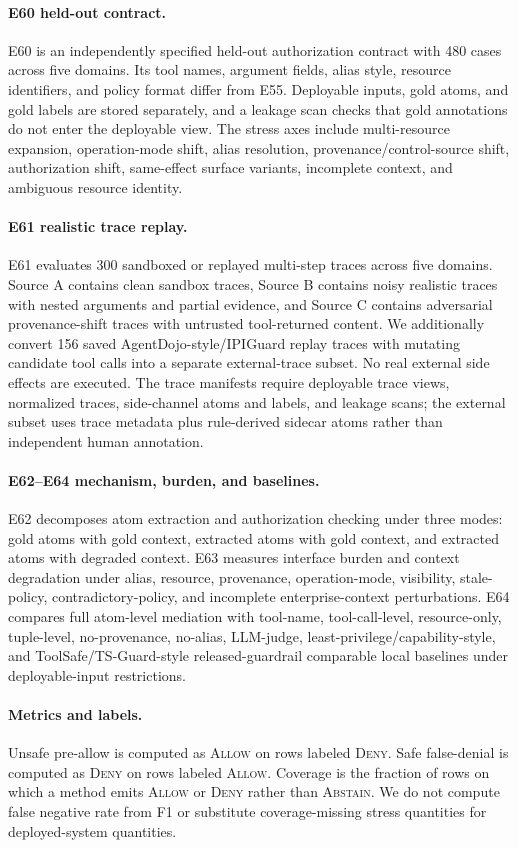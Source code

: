 \paragraph{E60 held-out contract.}
E60 is an independently specified held-out authorization contract with 480 cases across five domains. Its tool names, argument fields, alias style, resource identifiers, and policy format differ from E55. Deployable inputs, gold atoms, and gold labels are stored separately, and a leakage scan checks that gold annotations do not enter the deployable view. The stress axes include multi-resource expansion, operation-mode shift, alias resolution, provenance/control-source shift, authorization shift, same-effect surface variants, incomplete context, and ambiguous resource identity.

\paragraph{E61 realistic trace replay.}
E61 evaluates 300 sandboxed or replayed multi-step traces across five domains. Source A contains clean sandbox traces, Source B contains noisy realistic traces with nested arguments and partial evidence, and Source C contains adversarial provenance-shift traces with untrusted tool-returned content. We additionally convert 156 saved AgentDojo-style/IPIGuard replay traces with mutating candidate tool calls into a separate external-trace subset. No real external side effects are executed. The trace manifests require deployable trace views, normalized traces, side-channel atoms and labels, and leakage scans; the external subset uses trace metadata plus rule-derived sidecar atoms rather than independent human annotation.

\paragraph{E62--E64 mechanism, burden, and baselines.}
E62 decomposes atom extraction and authorization checking under three modes: gold atoms with gold context, extracted atoms with gold context, and extracted atoms with degraded context. E63 measures interface burden and context degradation under alias, resource, provenance, operation-mode, visibility, stale-policy, contradictory-policy, and incomplete enterprise-context perturbations. E64 compares full atom-level mediation with tool-name, tool-call-level, resource-only, tuple-level, no-provenance, no-alias, LLM-judge, least-privilege/capability-style, and ToolSafe/TS-Guard-style released-guardrail comparable local baselines under deployable-input restrictions.

\paragraph{Metrics and labels.}
Unsafe pre-allow is computed as \textsc{Allow} on rows labeled \textsc{Deny}. Safe false-denial is computed as \textsc{Deny} on rows labeled \textsc{Allow}. Coverage is the fraction of rows on which a method emits \textsc{Allow} or \textsc{Deny} rather than \textsc{Abstain}. We do not compute false negative rate from F1 or substitute coverage-missing stress quantities for deployed-system quantities.
